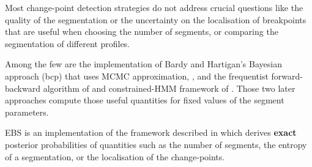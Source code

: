 \documentclass{bioinfo}
\begin{document}
 Most change-point detection strategies do not address crucial questions like the quality of the segmentation or the uncertainty on the localisation of breakpoints that are useful when choosing the number of segments, or comparing the segmentation of different profiles. 

Among the few are the implementation of Bardy and Hartigan's Bayesian approach (bcp) that uses MCMC approximation, \citep{barry_hartigan, bcp_package}, and the frequentist forward-backward algorithm of \cite{guedon_2008} and constrained-HMM framework of  \cite{Luong_HMM_2012}. Those two later approaches compute those useful quantities for fixed values of the segment parameters.

EBS is an implementation of the framework described in \cite{rigaill_exact_2011} which derives \textbf{exact} posterior probabilities of quantities such as the number of segments, the entropy of a segmentation, or the localisation of the change-points.
\end{document}
